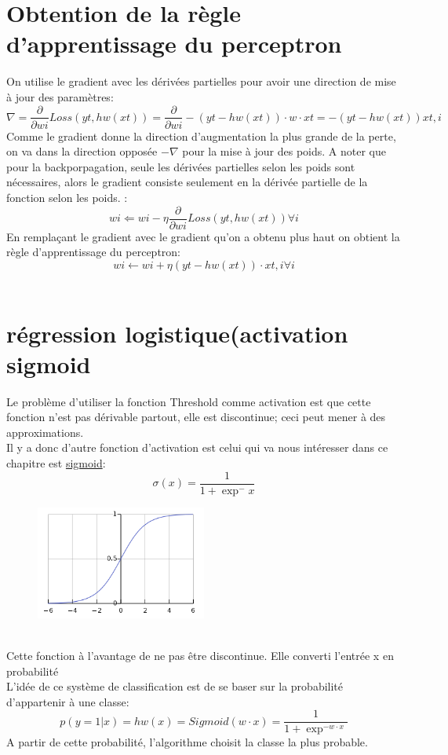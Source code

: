 \documentclass[openany,14pt,fleqn]{book} %
\begin{document}
\section{Obtention de la règle d'apprentissage du perceptron}

On utilise le gradient avec les dérivées partielles pour avoir une direction de mise à jour des paramètres\cite{Hugo_Larochelle8,Hugo_Larochelle9}:\\
$$\nabla = \frac{\partial}{\partial wi} Loss(yt,hw(xt)) = \frac{\partial}{\partial wi}-(yt-hw(xt))\cdot w \cdot xt = -(yt-hw(xt))xt,i$$
Comme le gradient donne la direction d'augmentation la plus grande de la perte, on va dans la direction opposée $-\nabla$ pour la mise à jour des poids. A noter que pour la backporpagation, seule les dérivées partielles selon les poids sont nécessaires, alors le gradient consiste seulement en la dérivée partielle de la fonction selon les poids.  :\\
$$wi\Leftarrow wi- \eta \frac{\partial}{\partial wi} Loss(yt,hw(xt))\forall i$$
En remplaçant le gradient avec le gradient qu'on a obtenu plus haut on obtient la règle d'apprentissage du perceptron:\\
$$wi\leftarrow wi + \eta (yt-hw(xt))\cdot xt,i \forall i$$\\

\section{régression logistique(activation sigmoid}
Le problème d'utiliser la fonction Threshold comme activation est que cette fonction n'est pas dérivable partout, elle est discontinue; ceci peut mener à des approximations.\cite{Hugo_Larochelle10}\\ \break 
Il y a donc d'autre fonction d'activation est celui qui va nous intéresser dans ce chapitre est \underline{sigmoid}:
$$ \sigma(x) = \frac{1}{1+\exp ^- x}$$
\begin{figure}[h]
\centering
\includegraphics[width=0.5\textwidth]{Pictures/320px-Logistic-curve_svg.png}
\end{figure}\\
Cette fonction à l'avantage de ne pas être discontinue. Elle converti l'entrée x en probabilité\\
L'idée de ce système de classification est de se baser sur la probabilité d'appartenir à une classe:\\
$$p(y=1|x) = hw(x) = Sigmoid(w\cdot x) = \frac{1}{1+\exp ^{-w\cdot x}}$$
A partir de cette probabilité, l'algorithme choisit la classe la plus probable.
\end{document}
